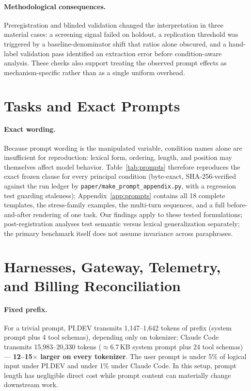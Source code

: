 \documentclass[11pt]{article}
\newcommand{\pidev}{PI.DEV}
\newcommand{\cc}{Claude Code}
\newcommand{\xd}{$\times$}
\begin{document}
\paragraph{Methodological consequences.} Preregistration and blinded
validation changed the interpretation in three material cases: a screening
signal failed on holdout, a replication threshold was triggered by a
baseline-denominator shift that ratios alone obscured, and a hand-label
validation pass identified an extraction error before condition-aware
analysis. These checks also support treating the observed prompt effects as
mechanism-specific rather than as a single uniform overhead.



\section{Tasks and Exact Prompts}
\label{app:taskprompts}
\paragraph{Exact wording.} Because prompt wording is the manipulated
variable, condition names alone are insufficient for reproduction: lexical
form, ordering, length, and position may themselves affect model behavior.
Table~\ref{tab:prompts} therefore reproduces the exact frozen clause for
every principal condition (byte-exact, SHA-256-verified against the run
ledger by \texttt{paper/make\_prompt\_appendix.py}, with a regression test
guarding staleness); Appendix~\ref{app:prompts} contains all 18 complete
templates, the stress-family examples, the multi-turn sequences, and a full
before-and-after rendering of one task. Our findings apply to these tested
formulations; post-registration analyses test semantic versus lexical generalization
separately; the primary benchmark itself does not assume invariance across
paraphrases.




\section{Harnesses, Gateway, Telemetry, and Billing Reconciliation}
\label{app:harness}

\paragraph{Fixed prefix.}
For a trivial prompt, \pidev{} transmits 1{,}147--1{,}642 tokens of prefix
(system prompt plus 4 tool schemas), depending only on tokenizer; \cc{}
transmits 15{,}983--20{,}330 tokens ($\approx$6.7\,KB system prompt plus
24 tool schemas) --- \textbf{12--15\xd{} larger on every tokenizer}. The
user prompt is under 5\% of logical input under \pidev{} and under 1\%
under \cc{}. In this setup, prompt length has negligible direct cost while
prompt content can materially change downstream work.
\end{document}
